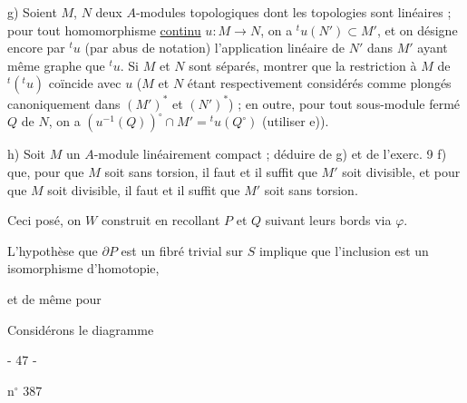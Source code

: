 g) Soient $M$, $N$ deux $A$-modules topologiques dont les topologies sont linéaires ; pour tout homomorphisme \uline{continu} $u:M\longrightarrow N$, on a ${}^tu(N')\subset M'$, et on désigne encore par ${}^tu$ (par abus de notation) l'application linéaire de $N'$ dans $M'$ ayant même graphe que ${}^tu$. Si $M$ et $N$ sont séparés, montrer que la restriction à $M$ de ${}^t({}^tu)$ coïncide avec $u$ ($M$ et $N$ étant respectivement considérés comme plongés canoniquement dans $(M')^*$ et $(N')^*$) ; en outre, pour tout sous-module fermé $Q$ de $N$, on a $(u^{-1}(Q))^\circ\cap M'={}^tu(Q^\circ)$ (utiliser e)).

h) Soit $M$ un $A$-module linéairement compact ; déduire de g) et de l'exerc. 9 f) que, pour que $M$ soit sans torsion, il faut et il suffit que $M'$ soit divisible, et pour que $M$ soit divisible, il faut et il suffit que $M'$ soit sans torsion.

\begin{center}\unsure{-:-:-:-}\end{center}
Ceci posé, on  $W$ construit en recollant $P$ et $Q$ suivant leurs bords  via $\varphi$.



L'hypothèse que $\partial P$ est un fibré trivial sur $S$ implique que l'inclusion 
est un isomorphisme d'homotopie,


et de même pour


Considérons le diagramme
\begin{center}- 47 -\end{center}
\hfill n$^\circ$ 387


